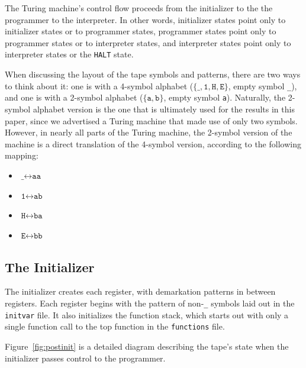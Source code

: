 \documentclass[11pt]{article}
\begin{document}
The Turing machine's control flow proceeds from the initializer to the the programmer to the interpreter. In other words, initializer states point only to initializer states or to programmer states, programmer states point only to programmer states or to interpreter states, and interpreter states point only to interpreter states or the \texttt{HALT} state. 

When discussing the layout of the tape symbols and patterns, there are two ways to think about it: one is with a 4-symbol alphabet ($\{\texttt{\_}, \texttt{1}, \texttt{H}, \texttt{E}\}$, empty symbol \texttt{\_}), and one is with a 2-symbol alphabet ($\{\texttt{a}, \texttt{b}\}$, empty symbol \texttt{a}). Naturally, the 2-symbol alphabet version is the one that is ultimately used for the results in this paper, since we advertised a Turing machine that made use of only two symbols. However, in nearly all parts of the Turing machine, the 2-symbol version of the machine is a direct translation of the 4-symbol version, according to the following mapping:

\begin{itemize}
\item $\texttt{\_} \leftrightarrow \texttt{aa}$
\item $\texttt{1} \leftrightarrow \texttt{ab}$
\item $\texttt{H} \leftrightarrow \texttt{ba}$
\item $\texttt{E} \leftrightarrow \texttt{bb}$
\end{itemize}

\subsection{The Initializer}

The initializer creates each register, with demarkation patterns in between registers. Each register begins with the pattern of non-\texttt{\_} symbols laid out in the \texttt{initvar} file. It also initializes the function stack, which starts out with only a single function call to the top function in the \texttt{functions} file.

Figure~\ref{fig:postinit} is a detailed diagram describing the tape's state when the initializer passes control to the programmer. 
\end{document}
